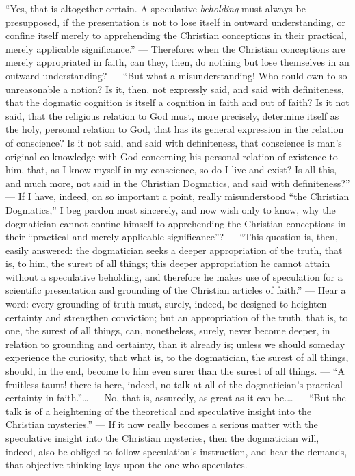 \documentclass[12pt]{book}
\begin{document}
``Yes, that is altogether certain. A speculative \emph{beholding} must always be presupposed, if the presentation is not to lose itself in outward understanding, or confine itself merely to apprehending the Christian conceptions in their practical, merely applicable significance.'' --- Therefore: when the Christian conceptions are merely appropriated in faith, can they, then, do nothing but lose themselves in an outward understanding?
--- ``But what a misunderstanding! Who could own to so unreasonable a notion? Is it, then, not expressly said, and said with definiteness, that the dogmatic cognition is itself a cognition in faith and out of faith? Is it not said, that the religious relation to God must, more precisely, determine itself as the holy, personal relation to God, that has its general expression in the relation of conscience? Is it not said, and said with definiteness, that conscience is man's original co-knowledge with God concerning his personal relation of existence to him, that, as I know myself in my conscience, so do I live and exist? Is all this, and much more, not said in the Christian Dogmatics, and said with definiteness?'' --- If I have, indeed, on so important a point, really misunderstood ``the Christian Dogmatics,'' I beg pardon most sincerely, and now wish only to know, why the dogmatician cannot confine himself to apprehending the Christian conceptions in their ``practical and merely applicable significance''? --- ``This question is, then, easily answered: the dogmatician seeks a deeper appropriation of the truth, that is, to him, the surest of all things; this deeper appropriation he cannot attain without a speculative beholding, and therefore he makes use of speculation for a scientific presentation and grounding of the Christian articles of faith.'' --- Hear a word: every grounding of truth must, surely, indeed, be designed to heighten certainty and strengthen conviction; but an appropriation of the truth, that is, to one, the surest of all things, can, nonetheless, surely, never become
deeper, in relation to grounding and certainty, than it already is; unless we should someday experience the curiosity, that what is, to the dogmatician, the surest of all things, should, in the end, become to him even surer than the surest of all things. --- ``A fruitless taunt! there is here, indeed, no talk at all of the dogmatician's practical certainty in faith.''\ldots{} --- No, that is, assuredly, as great as it can be.\ldots{} --- ``But the talk is of a heightening of the theoretical and speculative insight into the Christian mysteries.'' --- If it now really becomes a serious matter with the speculative insight into the Christian mysteries, then the dogmatician will, indeed, also be obliged to follow speculation's instruction, and hear the demands, that objective thinking lays upon the one who speculates.
\end{document}
